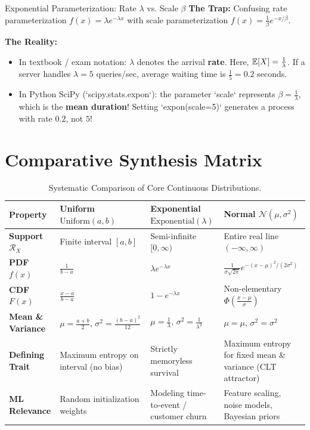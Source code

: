 \begin{trapbox}{Exponential Parameterization: Rate $\lambda$ vs. Scale $\beta$}
\textbf{The Trap:} Confusing rate parameterization $f(x) = \lambda e^{-\lambda x}$ with scale parameterization $f(x) = \frac{1}{\beta} e^{-x/\beta}$.

\textbf{The Reality:}
\begin{itemize}
    \item In textbook / exam notation: $\lambda$ denotes the arrival \textbf{rate}. Here, $\mathbb{E}[X] = \frac{1}{\lambda}$. If a server handles $\lambda = 5$ queries/sec, average waiting time is $\frac{1}{5} = 0.2$ seconds.
    \item In Python SciPy (`scipy.stats.expon`): the parameter `scale` represents $\beta = \frac{1}{\lambda}$, which is the \textbf{mean duration}! Setting `expon(scale=5)` generates a process with rate $0.2$, not $5$!
\end{itemize}
\end{trapbox}

\section{Comparative Synthesis Matrix}

\begin{table}[htbp]
\centering
\small
\begin{tabular}{p{2.8cm}p{3.8cm}p{3.8cm}p{4cm}}
\toprule
\textbf{Property} & \textbf{Uniform $\text{Uniform}(a, b)$} & \textbf{Exponential $\text{Exponential}(\lambda)$} & \textbf{Normal $\mathcal{N}(\mu, \sigma^2)$} \\
\midrule
\textbf{Support $\mathcal{R}_X$} & Finite interval $[a, b]$ & Semi-infinite $[0, \infty)$ & Entire real line $(-\infty, \infty)$ \\
\addlinespace
\textbf{PDF $f(x)$} & $\frac{1}{b - a}$ & $\lambda e^{-\lambda x}$ & $\frac{1}{\sigma\sqrt{2\pi}} e^{-(x-\mu)^2 / (2\sigma^2)}$ \\
\addlinespace
\textbf{CDF $F(x)$} & $\frac{x - a}{b - a}$ & $1 - e^{-\lambda x}$ & Non-elementary $\Phi\left(\frac{x - \mu}{\sigma}\right)$ \\
\addlinespace
\textbf{Mean \& Variance} & $\mu = \frac{a+b}{2}, \, \sigma^2 = \frac{(b-a)^2}{12}$ & $\mu = \frac{1}{\lambda}, \, \sigma^2 = \frac{1}{\lambda^2}$ & $\mu = \mu, \, \sigma^2 = \sigma^2$ \\
\addlinespace
\textbf{Defining Trait} & Maximum entropy on interval (no bias) & Strictly memoryless survival & Maximum entropy for fixed mean \& variance (CLT attractor) \\
\addlinespace
\textbf{ML Relevance} & Random initialization weights & Modeling time-to-event / customer churn & Feature scaling, noise models, Bayesian priors \\
\bottomrule
\end{tabular}
\caption{Systematic Comparison of Core Continuous Distributions.}
\end{table}

